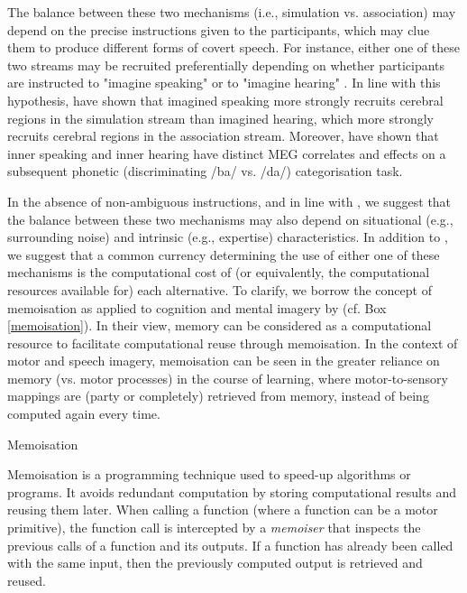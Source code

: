 \documentclass[utf8]{template/frontiersSCNS} %
\begin{document}
The balance between these two mechanisms (i.e., simulation vs. association) may depend on the precise instructions given to the participants, which may clue them to produce different forms of covert speech. For instance, either one of these two streams may be recruited preferentially depending on whether participants are instructed to "imagine speaking" or to "imagine hearing" \citep[see also the distinction between the "inner ear" and the "inner voice", e.g.,][]{smith_subvocalization_1992}. In line with this hypothesis, \cite{tian_mental_2016} have shown that imagined speaking more strongly recruits cerebral regions in the simulation stream than imagined hearing, which more strongly recruits cerebral regions in the association stream. Moreover, \cite{ma_distinct_2019} have shown that inner speaking and inner hearing have distinct MEG correlates and effects on a subsequent phonetic (discriminating /ba/ vs. /da/) categorisation task.

In the absence of non-ambiguous instructions, and in line with \cite{tian_mental_2012}, we suggest that the balance between these two mechanisms may also depend on situational (e.g., surrounding noise) and intrinsic (e.g., expertise) characteristics. In addition to \cite{tian_mental_2012}, we suggest that a common currency determining the use of either one of these mechanisms is the computational cost of (or equivalently, the computational resources available for) each alternative. To clarify, we borrow the concept of memoisation as applied to cognition and mental imagery by \cite{dasgupta_memory_2021} (cf. Box \ref{memoisation}). In their view, memory can be considered as a computational resource to facilitate computational reuse through memoisation. In the context of motor and speech imagery, memoisation can be seen in the greater reliance on memory (vs. motor processes) in the course of learning, where motor-to-sensory mappings are (party or completely) retrieved from memory, instead of being computed again every time.


\begin{mybox}[label = memoisation]{Memoisation}

Memoisation is a programming technique used to speed-up algorithms or programs. It avoids redundant computation by storing computational results and reusing them later. When calling a function (where a function can be a motor primitive), the function call is intercepted by a \textit{memoiser} that inspects the previous calls of a function and its outputs. If a function has already been called with the same input, then the previously computed output is retrieved and reused.

\end{mybox}
\end{document}
